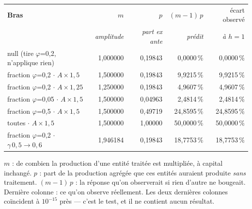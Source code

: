 \begin{center}\footnotesize
\begin{tabular}{@{}lrrrr@{}}
\toprule
\textbf{Bras} & $m$ & $p$ & $(m-1)\,p$ & écart observé \\
 & \emph{amplitude} & \emph{part ex ante} & \emph{prédit} & \emph{à $h=1$} \\
\midrule
null (tire $\varphi$=0,2, n'applique rien) & 1{,}000000 & 0{,}19843 & 0{,}0000\,\% & 0{,}0000\,\% \\
fraction $\varphi$=0,2 $\cdot$ $A\times1{,}5$ & 1{,}500000 & 0{,}19843 & 9{,}9215\,\% & 9{,}9215\,\% \\
fraction $\varphi$=0,2 $\cdot$ $A\times1{,}25$ & 1{,}250000 & 0{,}19843 & 4{,}9607\,\% & 4{,}9607\,\% \\
fraction $\varphi$=0,05 $\cdot$ $A\times1{,}5$ & 1{,}500000 & 0{,}04963 & 2{,}4814\,\% & 2{,}4814\,\% \\
fraction $\varphi$=0,5 $\cdot$ $A\times1{,}5$ & 1{,}500000 & 0{,}49719 & 24{,}8595\,\% & 24{,}8595\,\% \\
toutes $\cdot$ $A\times1{,}5$ & 1{,}500000 & 1{,}00000 & 50{,}0000\,\% & 50{,}0000\,\% \\
fraction $\varphi$=0,2 $\cdot$ $\gamma\,0{,}5\to0{,}6$ & 1{,}946184 & 0{,}19843 & 18{,}7753\,\% & 18{,}7753\,\% \\
\bottomrule
\end{tabular}
\end{center}

\noindent\footnotesize $m$ : de combien la production d'une entité traitée est multipliée, à capital inchangé. $p$ : part de la production agrégée que ces entités auraient produite \emph{sans} traitement. $(m-1)\,p$ : la réponse qu'on observerait si rien d'autre ne bougeait. Dernière colonne : ce qu'on observe réellement. Les deux dernières colonnes coïncident à $10^{-15}$ près --- c'est le test, et il ne contient aucun résultat.\normalsize
